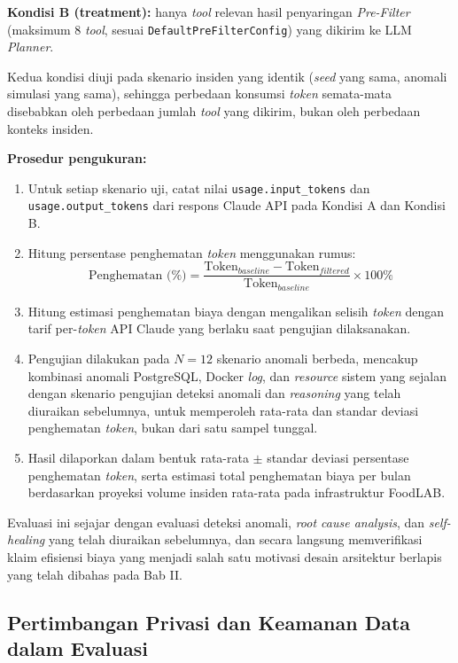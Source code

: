 \textbf{Kondisi B (treatment):} hanya \textit{tool} relevan hasil penyaringan \textit{Pre-Filter} (maksimum 8 \textit{tool}, sesuai \texttt{DefaultPreFilterConfig}) yang dikirim ke LLM \textit{Planner}.

Kedua kondisi diuji pada skenario insiden yang identik (\textit{seed} yang sama, anomali simulasi yang sama), sehingga perbedaan konsumsi \textit{token} semata-mata disebabkan oleh perbedaan jumlah \textit{tool} yang dikirim, bukan oleh perbedaan konteks insiden.

\textbf{Prosedur pengukuran:}
\begin{enumerate}[label=\arabic*., leftmargin=*]
  \item Untuk setiap skenario uji, catat nilai \texttt{usage.input\_tokens} dan \texttt{usage.output\_tokens} dari respons Claude API pada Kondisi A dan Kondisi B.
  \item Hitung persentase penghematan \textit{token} menggunakan rumus:
        \begin{equation}
          \text{Penghematan (\%)} = \frac{\text{Token}_{baseline} - \text{Token}_{filtered}}{\text{Token}_{baseline}} \times 100\%
        \end{equation}
  \item Hitung estimasi penghematan biaya dengan mengalikan selisih \textit{token} dengan tarif per-\textit{token} API Claude yang berlaku saat pengujian dilaksanakan.
  \item Pengujian dilakukan pada $N = 12$ skenario anomali berbeda, mencakup kombinasi anomali PostgreSQL, Docker \textit{log}, dan \textit{resource} sistem yang sejalan dengan skenario pengujian deteksi anomali dan \textit{reasoning} yang telah diuraikan sebelumnya, untuk memperoleh rata-rata dan standar deviasi penghematan \textit{token}, bukan dari satu sampel tunggal.
  \item Hasil dilaporkan dalam bentuk rata-rata $\pm$ standar deviasi persentase penghematan \textit{token}, serta estimasi total penghematan biaya per bulan berdasarkan proyeksi volume insiden rata-rata pada infrastruktur FoodLAB.
\end{enumerate}

Evaluasi ini sejajar dengan evaluasi deteksi anomali, \textit{root cause analysis}, dan \textit{self-healing} yang telah diuraikan sebelumnya, dan secara langsung memverifikasi klaim efisiensi biaya yang menjadi salah satu motivasi desain arsitektur berlapis yang telah dibahas pada Bab II.

\subsection{Pertimbangan Privasi dan Keamanan Data dalam Evaluasi}

